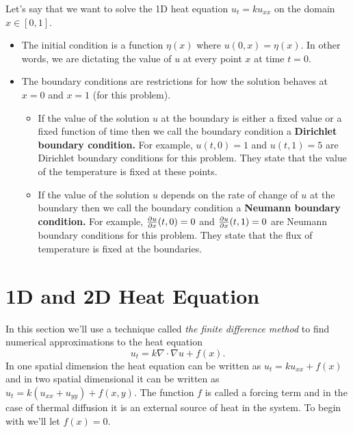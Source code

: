 \begin{definition}
    Let's say that we want to solve the 1D heat equation $u_t = k u_{xx}$ on the domain $x
    \in [0,1]$.  
    \begin{itemize}
        \item The initial condition is a function $\eta(x)$ where $u(0,x) = \eta(x)$.  In
            other words, we are dictating the value of $u$ at every point $x$ at time
            $t=0$. 
        \item The boundary conditions are restrictions for how the solution behaves at
            $x=0$ and $x=1$ (for this problem).  
            \begin{itemize}
                \item If the value of the solution $u$ at the boundary is either a fixed value or a fixed
                    function of time then we call the boundary condition a {\bf Dirichlet
                    boundary condition.}  For example, $u(t,0) = 1$ and $u(t,1) = 5$ are
                    Dirichlet boundary conditions for this problem.  They state that the
                    value of the temperature is fixed at these points.
                \item If the value of the solution $u$ depends on the rate of change of
                    $u$ at the boundary then we call the boundary condition a {\bf Neumann
                    boundary condition.}  For example, $\frac{\partial{u}}{\partial{x}}(t,0) = 0$ and
                    $\frac{\partial{u}}{\partial{x}}(t,1) = 0$ are Neumann boundary conditions for this problem.
                    They state that the flux of temperature is fixed at the boundaries.
            \end{itemize}
            
    \end{itemize}
\end{definition}


\section{1D and 2D Heat Equation}
In this section we'll use a technique called {\it the finite difference method} to find
numerical approximations to the heat equation
\[ u_t = k \nabla \cdot \nabla u + f(x). \]
In one spatial dimension the heat equation can be written as $u_t = ku_{xx} + f(x)$ and in
two spatial dimensional it can be written as $u_t = k \left( u_{xx} + u_{yy} \right) +
f(x,y)$.  The function $f$ is called a forcing term and in the case of thermal diffusion
it is an external source of heat in the system.  To begin with we'll let $f(x) = 0$.

